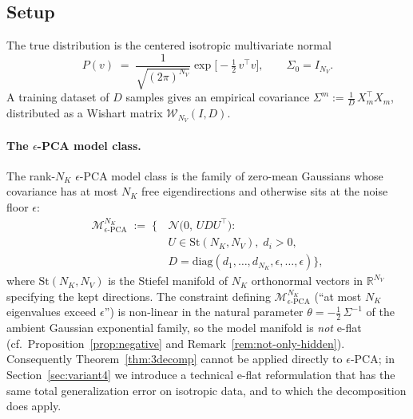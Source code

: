 \documentclass[11pt,a4paper]{article}
\theoremstyle{definition}
\theoremstyle{remark}
\newcommand{\R}{\mathbb{R}}
\newcommand{\PV}{P}
\newcommand{\NK}{N_K}
\newcommand{\NV}{N_V}
\newcommand{\Mfam}{\mathcal{M}}
\begin{document}
\subsection{Setup}

The true distribution is the centered isotropic multivariate
normal
\begin{equation}
  \PV(v) \;=\; \frac{1}{\sqrt{(2\pi)^{\NV}}}
              \exp\!\Big[-\tfrac{1}{2}\,v^{\top} v\Big],
  \qquad \Sigma_{0} = I_{\NV}.
  \label{eq:trueGaussian}
\end{equation}
A training dataset of $D$ samples gives an empirical covariance
$\Sigma^{m} := \frac{1}{D}\, X_{m}^{\top}X_{m}$, distributed as a
Wishart matrix $\mathcal{W}_{\NV}(I, D)$.

\paragraph{The $\epsilon$-PCA model class.}
The rank-$\NK$ $\epsilon$-PCA model class is the family of
zero-mean Gaussians whose covariance has at most $\NK$ free
eigendirections and otherwise sits at the noise floor $\epsilon$:
\begin{align}
  \Mfam_{\epsilon\text{-PCA}}^{\NK}
  \;:=\;
  \big\{\,& \mathcal{N}\!\big(0,\, U D U^{\top}\big) :
  \nonumber \\
  & U \in \mathrm{St}(\NK, \NV),\;
  d_{i} > 0,
  \nonumber \\
  & D = \mathrm{diag}(d_{1},\ldots,d_{\NK},
                       \epsilon,\ldots,\epsilon)\big\},
  \label{eq:epca-class}
\end{align}
where $\mathrm{St}(\NK, \NV)$ is the Stiefel manifold of $\NK$
orthonormal vectors in $\R^{\NV}$ specifying the kept directions.
The constraint defining $\Mfam_{\epsilon\text{-PCA}}^{\NK}$ (``at
most $\NK$ eigenvalues exceed $\epsilon$'') is non-linear in the
natural parameter $\theta = -\tfrac{1}{2}\,\Sigma^{-1}$ of the
ambient Gaussian exponential family, so the model manifold is
\emph{not} e-flat (cf.\ Proposition~\ref{prop:negative} and
Remark~\ref{rem:not-only-hidden}). Consequently
Theorem~\ref{thm:3decomp} cannot be applied directly to
$\epsilon$-PCA; in Section~\ref{sec:variant4} we introduce a
technical e-flat reformulation that has the same total
generalization error on isotropic data, and to which the
decomposition does apply.
\end{document}
